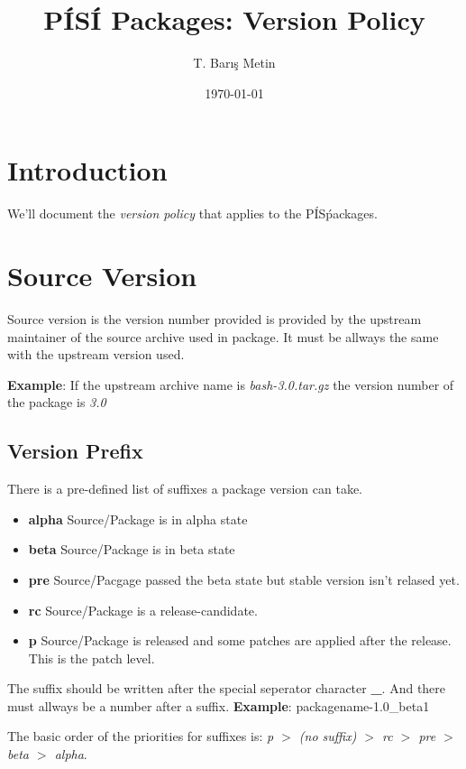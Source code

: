 \documentclass[a4paper,11pt]{article}
\title{P\'IS\'I Packages: Version Policy}
\date{\today}
\author{T. Bar\i{}\c s Metin}
\begin{document}
\maketitle

\section{Introduction}

We'll document the \emph{version policy} that applies to the P\'IS\'
packages.

\section{Source Version}

Source version is the version number provided is provided by the
upstream maintainer of the source archive used in package. It must be
allways the same with the upstream version used.

\textbf{Example}: If the upstream archive name is
\emph{bash-3.0.tar.gz} the version number of the package is \emph{3.0}

\subsection{Version Prefix}

There is a pre-defined list of suffixes a package version can
take.

\begin{itemize}
  \item \textbf{alpha} Source/Package is in alpha state
  \item \textbf{beta} Source/Package is in beta state
  \item \textbf{pre} Source/Pacgage passed the beta state but stable
    version isn't relased yet.
  \item \textbf{rc} Source/Package is a release-candidate.
  \item \textbf{p} Source/Package is released and some patches are
    applied after the release. This is the patch level.
\end{itemize}

The suffix should be written after the special seperator
character \textbf{\_}. And there must allways be a number after a
suffix. \textbf{Example}: packagename-1.0\_beta1

The basic order of the priorities for suffixes is:\newline
\emph{p $>$ (no suffix) $>$ rc $>$ pre $>$ beta $>$ alpha}.
\end{document}
